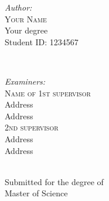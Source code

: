 \begin{titlepage}
	\begin{minipage}[t]{0.3\textwidth}
		\begin{flushleft} \normalsize
			\emph{Author:}\\
		    \textsc{Your Name}\\
            Your degree\\
            Student ID: 1234567\\
			\end{flushleft}
			\end{minipage}~
			\begin{minipage}[t]{0.6\textwidth}
            
			\begin{flushright} \normalsize
			\emph{Examiners:} \\
			\textsc{Name of 1st supervisor}\\
            Address\\
            Address \\
            \vspace{2em}
			\textsc{2nd supervisor}\\
            Address\\
            Address\\
            
		\end{flushright}
        
	\end{minipage}\\[2 cm]
	
	Submitted for the degree of\\
	Master of Science\\
	\thedate
    
    
    
    
	
\end{titlepage}